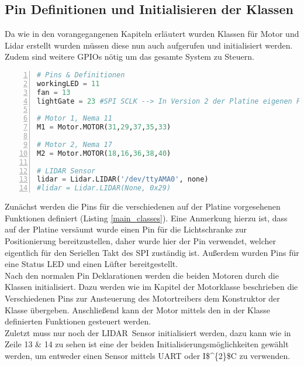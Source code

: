 \subsection{Pin Definitionen und Initialisieren der Klassen}
Da wie in den vorangegangenen Kapiteln erläutert wurden Klassen für Motor und Lidar erstellt wurden müssen diese nun auch aufgerufen und initialisiert werden. Zudem sind weitere \acp{GPIO} nötig um das gesamte System zu Steuern.
\begin{lstlisting}[caption={Initialisieren von Variablen und Klassen}, language={Python}, label={main_classes}, numbers=left]
# Pins & Definitionen
workingLED = 11
fan = 13
lightGate = 23 #SPI SCLK --> In Version 2 der Platine eigenen Pin zuweisen

# Motor 1, Nema 11
M1 = Motor.MOTOR(31,29,37,35,33)

# Motor 2, Nema 17
M2 = Motor.MOTOR(18,16,36,38,40)

# LIDAR Sensor
lidar = Lidar.LIDAR('/dev/ttyAMA0', none)
#lidar = Lidar.LIDAR(None, 0x29)
\end{lstlisting}
Zunächst werden die Pins für die verschiedenen auf der Platine vorgesehenen Funktionen definiert (Listing \ref{main_classes}). Eine Anmerkung hierzu ist, dass auf der Platine versäumt wurde einen Pin für die Lichtschranke zur Positionierung bereitzustellen, daher wurde hier der Pin verwendet, welcher eigentlich für den Seriellen Takt des \ac{SPI} zuständig ist. Außerdem wurden Pins für eine Status LED und einen Lüfter bereitgestellt. \\
Nach den normalen Pin Deklarationen werden die beiden Motoren durch die Klassen initialisiert. Dazu werden wie im Kapitel der Motorklasse beschrieben die Verschiedenen Pins zur Ansteuerung des Motortreibers dem Konstruktor der Klasse übergeben. Anschließend kann der Motor mittels den in der Klasse definierten Funktionen gesteuert werden.\\
Zuletzt muss nur noch der \ac{LIDAR} Sensor initialisiert werden, dazu kann wie in Zeile 13 \& 14 zu sehen ist eine der beiden Initialisierungsmöglichkeiten gewählt werden, um entweder einen Sensor mittels \ac{UART} oder \ac{I$^{2}$C} zu verwenden.\\
